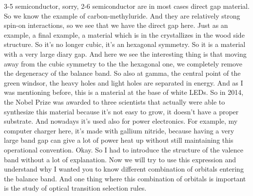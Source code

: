 3-5 semiconductor, sorry, 2-6 semiconductor are in most cases direct gap material. So we know the example of carbon-methyluride. And they are relatively strong spin-on interactions, so we see that we have the direct gap here. Just as an example, a final example, a material which is in the crystallizes in the wood side structure. So it's no longer cubic, it's an hexagonal symmetry. So it is a material with a very large diary gap. And here we see the interesting thing is that moving away from the cubic symmetry to the the hexagonal one, we completely remove the degeneracy of the balance band. So also at gamma, the central point of the green windsor, the heavy holes and light holes are separated in energy. And as I was mentioning before, this is a material at the base of white LEDs. So in 2014, the Nobel Prize was awarded to three scientists that actually were able to synthesize this material because it's not easy to grow, it doesn't have a proper substrate. And nowadays it's used also for power electronics. For example, my computer charger here, it's made with gallium nitride, because having a very large band gap can give a lot of power heat up without still maintaining this operational convention. Okay. So I had to introduce the structure of the valence band without a lot of explanation. Now we will try to use this expression and understand why I wanted you to know different combination of orbitals entering the balance band. And one thing where this combination of orbitals is important is the study of optical transition selection rules.
